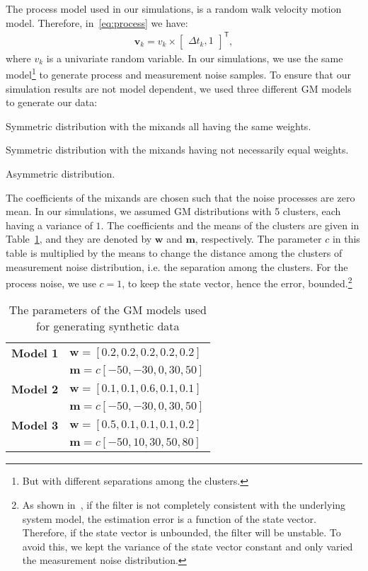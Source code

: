 \documentclass[10pt,twocolumn,twoside]{IEEEtran}
\newcommand{\tran}{^{\mathsf{T}}}
\begin{document}
The process model used in our simulations, is a random walk velocity motion model. Therefore, in~\eqref{eq:process} we have:
\begin{align}
\mathbf{v}_{k} = v_k \times \begin{bmatrix}
\Delta t_{k} ,
1
\end{bmatrix}\tran,
\end{align}
where \(v_k\) is a univariate random variable. In our simulations, we use the same model\footnote{But with different separations among the clusters.} to generate process and measurement noise samples. To ensure that our simulation results are not model dependent, we used three different GM models to generate our data:
\begin{itemize}
{\setlength\itemindent{35pt}\item[\textbf{Model 1:}] Symmetric distribution with the mixands all having the same weights.}
{\setlength\itemindent{35pt}\item[\textbf{Model 2:}] Symmetric distribution with the mixands having not necessarily equal weights.}
{\setlength\itemindent{35pt}\item[\textbf{Model 3:}] Asymmetric distribution.}
\end{itemize}
The coefficients of the mixands are chosen such that the noise processes are zero mean. In our simulations, we assumed GM distributions with 5 clusters, each having a variance of \(1\). The coefficients and the means of the clusters are given in Table~\ref{tab:GMModelsparams}, and they are denoted by \(\mathbf{w}\) and \(\mathbf{m}\), respectively. The parameter \(c\) in this table is multiplied by the means to change the distance among the clusters of measurement noise distribution, i.e. the separation among the clusters. For the process noise, we use \(c=1\), to keep the state vector, hence the error, bounded.\footnote{As shown in~\cite{bar2001estimation}, if the filter is not completely consistent with the underlying system model, the estimation error is a function of the state vector. Therefore, if the state vector is unbounded, the filter will be unstable. To avoid this, we kept the variance of the state vector constant and only varied the measurement noise distribution.}
\begin{table}[!t]
\centering
\caption{The parameters of the GM models used for generating synthetic data}
\label{tab:GMModelsparams}
\begin{tabular}{c l}
\hline
\textbf{Model 1} & \(\mathbf{w} = \left[0.2,0.2,0.2,0.2,0.2\right]\) \\
& \(\mathbf{m}=c \left[-50,-30,0,30,50\right]\) \\
\hline
\textbf{Model 2} & \(\mathbf{w} = \left[0.1,0.1,0.6,0.1,0.1\right]\) \\
& \(\mathbf{m}=c\left[-50,-30,0,30,50\right]\) \\
\hline
\textbf{Model 3} & \(\mathbf{w} = \left[0.5,0.1,0.1,0.1,0.2\right]\) \\
& \(\mathbf{m}=c\left[-50,10,30,50,80\right]\) \\
\hline
\end{tabular}
\end{table}
\end{document}
